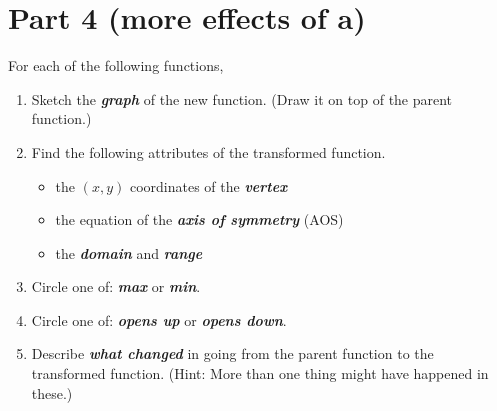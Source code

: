 \newpage
\section*{Part 4 (more effects of $\bm{a}$)}

{
\small
For each of the following functions,
\begin{enumerate}[nosep]
    \item Sketch the {\bfseries\itshape graph} of the new function. (Draw it on top of the parent function.)
    \item Find the following attributes of the transformed function.
    \begin{itemize}[nosep]
        \item the $(x,y)$ coordinates of the {\bfseries\itshape vertex}
        \item the equation of the {\bfseries\itshape axis of symmetry} (AOS)
        \item the {\bfseries\itshape domain} and {\bfseries\itshape range}
    \end{itemize}
    \item Circle one of: {\bfseries\itshape max} or {\bfseries\itshape min}.
    \item Circle one of: {\bfseries\itshape opens up} or {\bfseries\itshape opens down}.
    \item Describe {\bfseries\itshape what changed} in going from the parent function to the transformed function.
        (Hint: More than one thing might have happened in these.)
\end{enumerate}
}
\vspace{\baselineskip}

\begin{tcbposter}[
        poster = {
            rows=7,
            columns=2,
            height=10cm,
            spacing=1mm,
            },
        boxes = {colbacktitle=black!15,coltitle=black,colback=white,sharp corners}
    ]
\end{tcbposter}




